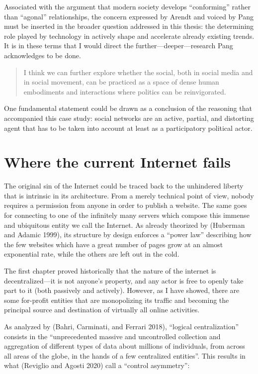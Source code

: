 \documentclass[
  a4paper,
]{book}
\begin{document}
Associated with the argument that modern society develops ``conforming'' rather than ``agonal'' relationships, the concern expressed by Arendt and voiced by Pang must be inserted in the broader question addressed in this thesis: the determining role played by technology in actively shape and accelerate already existing trends. It is in these terms that I would direct the further---deeper---research Pang acknowledges to be done.

\begin{quote}
I think we can further explore whether the social, both in social media and in social movement, can be practiced as a space of dense human embodiments and interactions where politics can be reinvigorated.
\end{quote}

One fundamental statement could be drawn as a conclusion of the reasoning that accompanied this case study: social networks are an active, partial, and distorting agent that has to be taken into account at least as a participatory political actor.

\hypertarget{where-the-current-internet-fails}{%
\chapter{Where the current Internet fails}\label{where-the-current-internet-fails}}

The original sin of the Internet could be traced back to the unhindered liberty that is intrinsic in its architecture. From a merely technical point of view, nobody requires a permission from anyone in order to publish a website. The same goes for connecting to one of the infinitely many servers which compose this immense and ubiquitous entity we call the Internet. As already theorized by {(Huberman and Adamic 1999)}, its structure by design enforces a ``power law'' describing how the few websites which have a great number of pages grow at an almost exponential rate, while the others are left out in the cold.

The first chapter proved historically that the nature of the internet is decentralized---it is not anyone's property, and any actor is free to openly take part to it (both passively and actively). However, as I have showed, there are some for-profit entities that are monopolizing its traffic and becoming the principal source and destination of virtually all online activities.

As analyzed by {(Bahri, Carminati, and Ferrari 2018)}, ``logical centralization'' consists in the ``unprecedented massive and uncontrolled collection and aggregation of different types of data about millions of individuals, from across all areas of the globe, in the hands of a few centralized entities''. This results in what {(Reviglio and Agosti 2020)} call a ``control asymmetry'':
\end{document}
